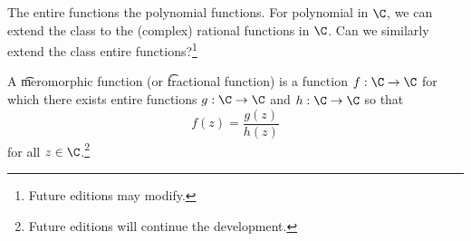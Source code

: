 

The entire functions  the polynomial functions.
For polynomial in $\C$, we can extend the class to the (complex) rational functions in $\C$.
Can we similarly extend the class entire functions?\footnote{Future editions may modify.}


A \t{meromorphic function} (or \t{fractional function}) is a function $f: \C \to \C$ for which there exists entire functions $g: \C \to \C$ and $h: \C \to \C$ so that
\[
  f(z) = \frac{g(z)}{h(z)}
\]
for all $z \in \C$.\footnote{Future editions will continue the development.}





\blankpage
